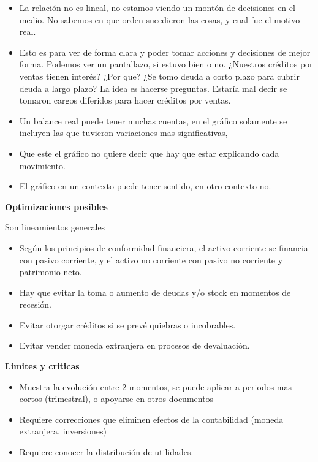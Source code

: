 \documentclass[titlepage,a4paper]{article}
\begin{document}
\begin{itemize}
    \item La relación no es lineal, no estamos viendo un montón de decisiones en el medio. No sabemos en que orden sucedieron las cosas, y cual fue el motivo real.
    \item Esto es para ver de forma clara y poder tomar acciones y decisiones de mejor forma. Podemos ver un pantallazo, si estuvo bien o no. ¿Nuestros créditos por ventas tienen interés? ¿Por que? ¿Se tomo deuda a corto plazo para cubrir deuda a largo plazo? La idea es hacerse preguntas. Estaría mal decir se tomaron cargos diferidos para hacer créditos por ventas. 
    \item Un balance real puede tener muchas cuentas, en el gráfico solamente se incluyen las que tuvieron variaciones mas significativas,
    \item Que este el gráfico no quiere decir que hay que estar explicando cada movimiento.
    \item El gráfico en un contexto puede tener sentido, en otro contexto no.
\end{itemize}

\medskip
\textbf{Optimizaciones posibles}

\medskip
Son lineamientos generales
\begin{itemize}
    \item Según los principios de conformidad financiera, el activo corriente se financia con pasivo corriente, y el activo no corriente con pasivo no corriente y patrimonio neto.
    \item Hay que evitar la toma o aumento de deudas y/o stock en momentos de recesión.
    \item Evitar otorgar créditos si se prevé quiebras o incobrables.
    \item Evitar vender moneda extranjera en procesos de devaluación.
\end{itemize}

\medskip
\textbf{Limites y criticas}

\medskip
\begin{itemize}
    \item Muestra la evolución entre 2 momentos, se puede aplicar a periodos mas cortos (trimestral), o apoyarse en otros documentos
    \item Requiere correcciones que eliminen efectos de la contabilidad (moneda extranjera, inversiones)
    \item Requiere conocer la distribución de utilidades.
\end{itemize}
\end{document}
